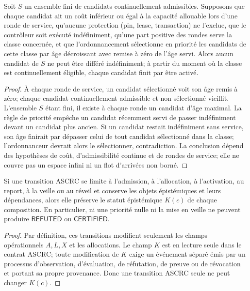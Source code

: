 \begin{proposition}
Soit $S$ un ensemble fini de candidats continuellement admissibles. Supposons que chaque candidat ait un coût inférieur ou égal à la capacité allouable lors d'une ronde de service, qu'aucune protection (pin, lease, transaction) ne l'exclue, que le contrôleur soit exécuté indéfiniment, qu'une part positive des rondes serve la classe concernée, et que l'ordonnancement sélectionne en priorité les candidats de cette classe par âge décroissant avec remise à zéro de l'âge servi. Alors aucun candidat de $S$ ne peut être différé indéfiniment; à partir du moment où la classe est continuellement éligible, chaque candidat finit par être activé.
\end{proposition}
\begin{proof}
À chaque ronde de service, un candidat sélectionné voit son âge remis à zéro; chaque candidat continuellement admissible et non sélectionné vieillit. L'ensemble $S$ étant fini, il existe à chaque ronde un candidat d'âge maximal. La règle de priorité empêche un candidat récemment servi de passer indéfiniment devant un candidat plus ancien. Si un candidat restait indéfiniment sans service, son âge finirait par dépasser celui de tout candidat sélectionné dans la classe; l'ordonnanceur devrait alors le sélectionner, contradiction. La conclusion dépend des hypothèses de coût, d'admissibilité continue et de rondes de service; elle ne couvre pas un espace infini ni un flot d'arrivées non borné.
\end{proof}
\begin{proposition}
Si une transition ASCRC se limite à l'admission, à l'allocation, à l'activation, au report, à la veille ou au réveil et conserve les objets épistémiques et leurs dépendances, alors elle préserve le statut épistémique $K(c)$ de chaque composition. En particulier, ni une priorité nulle ni la mise en veille ne peuvent produire $\mathsf{REFUTED}$ ou $\mathsf{CERTIFIED}$.
\end{proposition}
\begin{proof}
Par définition, ces transitions modifient seulement les champs opérationnels $A,L,X$ et les allocations. Le champ $K$ est en lecture seule dans le contrat ASCRC; toute modification de $K$ exige un événement séparé émis par un processus d'observation, d'évaluation, de réfutation, de preuve ou de révocation et portant sa propre provenance. Donc une transition ASCRC seule ne peut changer $K(c)$.
\end{proof}

